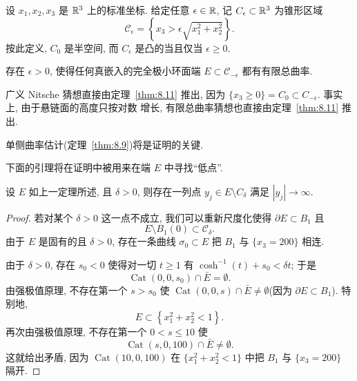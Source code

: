 设 $x_1,x_2,x_3$ 是 $\mathbb{R}^3$ 上的标准坐标. 给定任意 $\epsilon\in\mathbb{R}$, 记
$C_\epsilon\subset\mathbb{R}^3$ 为锥形区域
\begin{equation}
\mathcal{C}_\epsilon=\left\{x_3>\epsilon\sqrt{x_1^2+x_2^2}\right\}.
\label{eq:8.63}
\end{equation}
按此定义, $C_0$ 是半空间, 而 $C_\epsilon$ 是凸的当且仅当 $\epsilon\geq0$.

\begin{theorem}
\label{thm:8.11}
存在 $\epsilon>0$, 使得任何真嵌入的完全极小环面端
$E\subset\mathcal{C}_{-\epsilon}$ 都有有限总曲率.
\end{theorem}

广义 Nitsche 猜想直接由定理~\ref{thm:8.11} 推出, 因为
$\{x_3\geq0\}=C_0\subset C_{-\epsilon}$. 事实上, 由于悬链面的高度只按对数
增长, 有限总曲率猜想也直接由定理~\ref{thm:8.11} 推出.

单侧曲率估计(定理~\ref{thm:8.9})将是证明的关键.

下面的引理将在证明中被用来在端 $E$ 中寻找``低点''.

\begin{lemma}
\label{lem:8.12}
设 $E$ 如上一定理所述, 且 $\delta>0$, 则存在一列点
$y_j\in E\setminus C_\delta$ 满足 $|y_j|\to\infty$.
\end{lemma}

\begin{proof}
若对某个 $\delta>0$ 这一点不成立, 我们可以重新尺度化使得
$\partial E\subset B_1$ 且
\begin{equation}
E\setminus B_1(0)\subset\mathcal{C}_\delta.
\label{eq:8.64}
\end{equation}
由于 $E$ 是固有的且 $\delta>0$, 存在一条曲线 $\sigma_0\subset E$ 把 $B_1$
与 $\{x_3=200\}$ 相连.

由于 $\delta>0$, 存在 $s_0<0$ 使得对一切 $t\geq1$ 有
$\cosh^{-1}(t)+s_0<\delta t$; 于是
\begin{equation}
\operatorname{Cat}(0,0,s_0)\cap\bar E=\emptyset.
\label{eq:8.65}
\end{equation}
由强极值原理, 不存在第一个 $s>s_0$ 使
$\operatorname{Cat}(0,0,s)\cap\bar E\neq\emptyset$(因为
$\partial E\subset B_1$). 特别地,
\begin{equation}
E\subset\left\{x_1^2+x_2^2<1\right\}.
\label{eq:8.66}
\end{equation}
再次由强极值原理, 不存在第一个 $0<s\leq10$ 使
\begin{equation}
\operatorname{Cat}(s,0,100)\cap\bar E\neq\emptyset.
\label{eq:8.67}
\end{equation}
这就给出矛盾, 因为 $\operatorname{Cat}(10,0,100)$ 在
$\{x_1^2+x_2^2<1\}$ 中把 $B_1$ 与 $\{x_3=200\}$ 隔开.
\end{proof}

